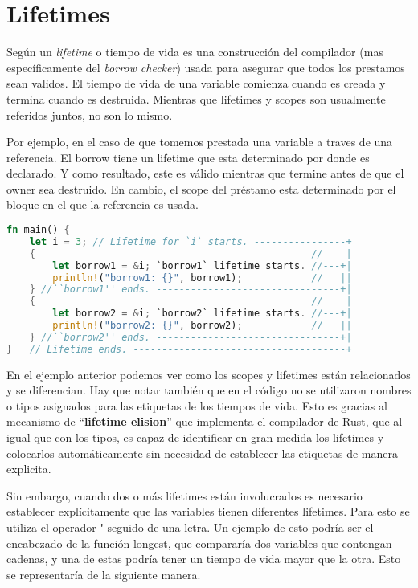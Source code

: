 \section{Lifetimes}

Según  un \textit{lifetime} o tiempo de vida es una construcción del compilador (mas específicamente del \textit{borrow checker}) usada para asegurar que todos los prestamos sean validos. El tiempo de vida de una variable comienza cuando es creada y termina cuando es destruida. Mientras que lifetimes y scopes son usualmente referidos juntos, no son lo mismo.

Por ejemplo, en el caso de que tomemos prestada una variable a traves de una referencia. El borrow tiene un lifetime que esta determinado por donde es declarado. Y como resultado, este es válido mientras que termine antes de que el owner sea destruido. En cambio, el scope del préstamo esta determinado por el bloque en el que la referencia es usada.

\begin{lstlisting}[language=Rust]
fn main() {
    let i = 3; // Lifetime for `i` starts. ----------------+
    {                                                //    |
        let borrow1 = &i; `borrow1` lifetime starts. //---+|
        println!("borrow1: {}", borrow1);            //   ||
    } //``borrow1'' ends. --------------------------------+|
    {                                                //    |
        let borrow2 = &i; `borrow2` lifetime starts. //---+|
        println!("borrow2: {}", borrow2);            //   ||
    } //``borrow2'' ends. --------------------------------+|
}   // Lifetime ends. -------------------------------------+

\end{lstlisting}

En el ejemplo anterior podemos ver como los scopes y lifetimes están relacionados y se diferencian. Hay que notar también que en el código no se utilizaron nombres o tipos asignados para las etiquetas de los tiempos de vida. Esto es gracias al mecanismo de ``\textbf{lifetime elision}'' que implementa el compilador de Rust, que al igual que con los tipos, es capaz de identificar en gran medida los lifetimes y colocarlos automáticamente sin necesidad de establecer las etiquetas de manera explicita.

Sin embargo, cuando dos o más lifetimes están involucrados es necesario establecer explícitamente que las variables tienen diferentes lifetimes. Para esto se utiliza el operador \textbf{\'} seguido de una letra. Un ejemplo de esto podría ser el encabezado de la función longest, que compararía dos variables que contengan cadenas, y una de estas podría tener un tiempo de vida mayor que la otra. Esto se representaría de la siguiente manera.

